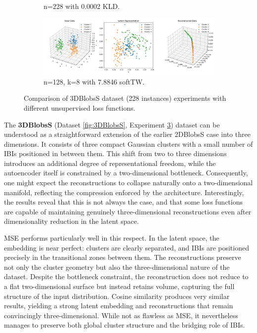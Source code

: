 \begin{figure}[htbp]
\begin{subfigure}[b]{1.0\textwidth}
    \caption{n=228 with 0.0002 KLD.}
    \label{fig:RQ2/kld/3DBlobsS}
  \end{subfigure}
  \hfill
  \begin{subfigure}[b]{1.0\textwidth}
    \centering
    \includegraphics[width=\linewidth]{images/RQ2/tru/3DBlobsS_128n_8k_7.8846.png}
    \caption{n=128, k=8 with 7.8846 softTW.}
    \label{fig:RQ2/tru/3DBlobsS}
  \end{subfigure}

  \caption{Comparison of 3DBlobsS dataset (228 instances) experiments with different unsupervised loss functions.}
  \label{fig:RQ2/3DBlobsS}
\end{figure}

The \textbf{3DBlobsS} (Dataset \ref{fig:3DBlobsS}, Experiment \ref{fig:RQ2/3DBlobsS}) dataset can be understood as a straightforward extension of the earlier 2DBlobsS case into three dimensions. It consists of three compact Gaussian clusters with a small number of IBIs positioned in between them. This shift from two to three dimensions introduces an additional degree of representational freedom, while the autoencoder itself is constrained by a two-dimensional bottleneck. Consequently, one might expect the reconstructions to collapse naturally onto a two-dimensional manifold, reflecting the compression enforced by the architecture. Interestingly, the results reveal that this is not always the case, and that some loss functions are capable of maintaining genuinely three-dimensional reconstructions even after dimensionality reduction in the latent space.

MSE performs particularly well in this respect. In the latent space, the embedding is near perfect: clusters are clearly separated, and IBIs are positioned precisely in the transitional zones between them. The reconstructions preserve not only the cluster geometry but also the three-dimensional nature of the dataset. Despite the bottleneck constraint, the reconstruction does not reduce to a flat two-dimensional surface but instead retains volume, capturing the full structure of the input distribution. Cosine similarity produces very similar results, yielding a strong latent embedding and reconstructions that remain convincingly three-dimensional. While not as flawless as MSE, it nevertheless manages to preserve both global cluster structure and the bridging role of IBIs.

